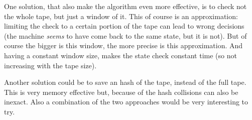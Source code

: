 \documentclass{report}
\begin{document}
One solution, that also make the algorithm even more effective, is to check not the whole tape, but just a window of it. This of course is an approximation: limiting the check to a certain portion of the tape can lead to wrong decisions (the machine \textit{seems} to have come back to the same state, but it is not).
But of course the bigger is this window, the more precise is this approximation. And having a constant window size, makes the state check constant time (so not increasing with the tape size).

Another solution could be to save an hash of the tape, instead of the full tape. This is very memory effective but, because of the hash collisions can also be inexact. Also a combination of the two approaches would be very interesting to try.





\end{document}
